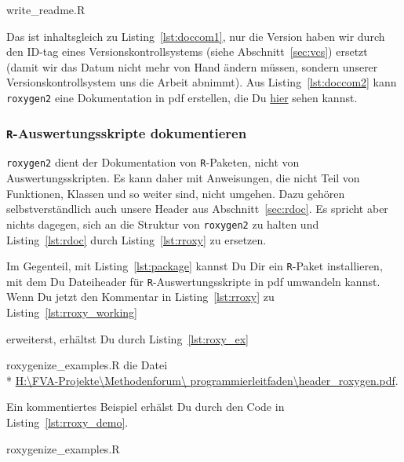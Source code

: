 \documentclass[twoside]{scrartcl}
\providecommand{\R}{\texttt{R}}
\providecommand{\code}[1]{\texttt{#1}}
\begin{document}
%
{write_readme.R}

Das ist inhaltsgleich zu  Listing~\ref{lst:doccom1}, nur die Version haben wir 
durch den ID-tag eines Versionskontrollsystems (siehe Abschnitt~\ref{sec:vcs}) 
ersetzt (damit wir das Datum nicht mehr von Hand
\"a{}ndern m\"u{}ssen, sondern unserer Versionskontrollsystem uns die Arbeit
abnimmt).
Aus Listing~\ref{lst:doccom2}  kann \code{roxygen2} eine Dokumentation in pdf 
erstellen, die Du \href{write_readme.pdf}{hier} sehen kannst.

\subsubsection{\R{}-Auswertungsskripte dokumentieren
\label{sec:roxygen2ForSingleFiles}}
\code{roxygen2} dient der Dokumentation von \R{}-Paketen, nicht von
Auswertungsskripten. Es kann daher mit Anweisungen, die nicht Teil von
Funktionen, Klassen und so weiter sind, nicht umgehen. Dazu geh\"oren
selbstverst\"a{}ndlich auch unsere Header aus Abschnitt~\ref{sec:rdoc}.
Es spricht aber nichts dagegen, sich an die Struktur von \code{roxygen2} zu
halten und Listing~\ref{lst:rdoc} durch Listing~\ref{lst:rroxy} zu ersetzen.


Im Gegenteil, mit Listing~\ref{lst:package} kannst Du Dir ein \R{}-Paket
installieren, mit dem Du 
Dateiheader 
f\"u{}r \R{}-Auswertungsskripte in pdf 
umwandeln
kannst.
Wenn Du jetzt den Kommentar in  Listing~\ref{lst:rroxy} zu
Listing~\ref{lst:rroxy_working} 

erweiterst, erh\"altst Du durch
Listing~\ref{lst:roxy_ex} 

{roxygenize_examples.R} die Datei \\*
\href{%
header_roxygen.pdf}{%
H:\textbackslash{}FVA-Projekte\textbackslash{}Methodenforum\textbackslash{}%
programmierleitfaden\textbackslash{}header\_roxygen.pdf}.  

Ein kommentiertes Beispiel erh\"a{}lst Du
durch den Code in Listing~\ref{lst:rroxy_demo}. 

{roxygenize_examples.R}
\end{document}

